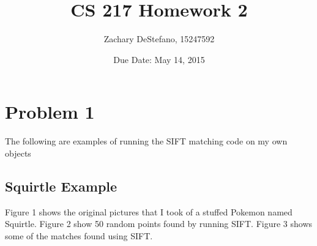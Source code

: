 \documentclass[11pt,psfig]{article}
\begin{document}
\setlength{\parskip}{1.2ex plus0.3ex minus 0.3ex}


\thispagestyle{empty} \pagestyle{myheadings} 



\title{CS 217 Homework 2}
\author{Zachary DeStefano, 15247592}
\date{Due Date: May 14, 2015}

\maketitle

\vfill\eject

\newpage

\section*{Problem 1}

The following are examples of running the SIFT matching code on my own objects

\subsection*{Squirtle Example}

Figure 1 shows the original pictures that I took of a stuffed Pokemon named Squirtle. Figure 2 show 50 random points found by running SIFT. Figure 3 shows some of the matches found using SIFT. 
\end{document}
